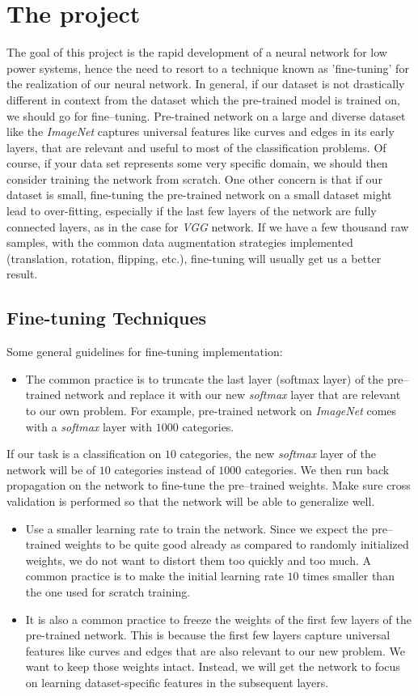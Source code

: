 \section{The project}
\label{sec:project}
The goal of this project is the rapid development of a neural network for low 
power systems, hence the need to resort to a technique known as 
'fine-tuning' for the realization of our neural network.
In general, if our dataset is not drastically different in context from the 
dataset which the pre-trained model is trained on, we should go for 
fine--tuning.
Pre-trained network on a large and diverse dataset like the \emph{ImageNet} 
captures  universal features like curves and edges in its early layers, that are
relevant and useful to most of the classification problems.
Of course, if your data set represents some very specific domain, we should 
then consider training the network from scratch.
One other concern is that if our dataset is small, fine-tuning the pre-trained 
network on a small dataset might lead to over-fitting, especially if the last few 
layers of the network are fully connected layers, as in the case for \emph{VGG} 
network. 
If we have a few thousand raw samples, with the common data augmentation 
strategies implemented (translation, rotation, flipping, etc.), fine-tuning will 
usually get us a better result.
%
\subsection{Fine-tuning Techniques}
\label{subsec:fine-tuning}
Some general guidelines for fine-tuning implementation:
\begin{itemize}
\item The common practice is to truncate the last layer (softmax layer) of the 
pre--trained network and replace it with our new \emph{softmax} layer that are 
relevant to our own problem. For example, pre-trained network on \emph{ImageNet} 
comes with a \emph{softmax} layer with $1000$ categories.
\end{itemize}
If our task is a classification on $10$ categories, the new \emph{softmax} layer
of the network will be of $10$ categories instead of $1000$ categories.
We then run back propagation on the network to fine-tune the pre--trained 
weights. Make sure cross validation is performed so that the network will be 
able to generalize well.
\begin{itemize}
\item  Use a smaller learning rate to train the network. 
Since we expect the pre--trained weights to be quite good already as compared 
to randomly initialized weights, we do not want to distort them too quickly and 
too much. 
A common practice is to make the initial learning rate $10$ times smaller than 
the one used for scratch training.
\item It is also a common practice to freeze the weights of the first few layers 
of the pre-trained network. 
This is because the first few layers capture universal features like curves and 
edges that are also relevant to our new problem. 
We want to keep those weights intact. Instead, we will get the network to 
focus on learning dataset-specific features in the subsequent layers.
\end{itemize}
%
